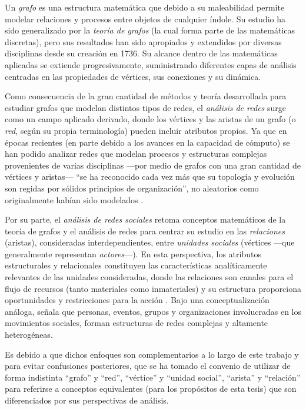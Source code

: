 \documentclass[letterpaper, 11pt]{book}
\theoremstyle{definition}
\theoremstyle{remark}
\begin{document}
Un \emph{grafo} es una estructura matemática que debido a su maleabilidad permite modelar relaciones y procesos entre objetos de cualquier índole. Su estudio ha sido generalizado por la \emph{teoría de grafos} (la cual forma parte de las matemáticas discretas), pero sus resultados han sido apropiados y extendidos por diversas disciplinas desde su creación en 1736. Su alcance dentro de las matemáticas aplicadas se extiende progresivamente, suministrando diferentes capas de análisis centradas en las propiedades de vértices, sus conexiones y su dinámica.


Como consecuencia de la gran cantidad de métodos y teoría desarrollada para estudiar grafos que modelan distintos tipos de redes, el \emph{análisis de redes} surge como un campo aplicado derivado, donde los vértices y las aristas de un grafo (o \emph{red}, según su propia terminología) pueden incluir atributos propios. 
Ya que en épocas recientes (en parte debido a los avances en la capacidad de cómputo) se han podido analizar redes que modelan procesos y estructuras complejas provenientes de varias disciplinas ---por medio de grafos con una gran cantidad de vértices y aristas--- ``se ha reconocido cada vez más que su topología y evolución son regidas por sólidos principios de organización'', no aleatorios como originalmente habían sido modelados \citep[47]{2002_Barabasi_MechanicsOfComplexNetworks}.

Por su parte, el \emph{análisis de redes sociales} retoma conceptos matemáticos de la teoría de grafos y el análisis de redes para centrar su estudio en las \emph{relaciones} (aristas), consideradas interdependientes, entre \emph{unidades sociales} (vértices ---que generalmente representan \emph{actores}---). 
En esta perspectiva, los atributos estructurales y relacionales constituyen las características analíticamente relevantes de las unidades consideradas, donde las relaciones son canales para el flujo de recursos (tanto materiales como inmateriales) y su estructura proporciona oportunidades y restricciones para la acción \citep[368]{2014_Caiani_SNA}. 
Bajo una conceptualización análoga, \citet{2003_Diani_SocialNetworks} señala que personas, eventos, grupos y organizaciones involucradas en los movimientos sociales, forman estructuras de redes complejas y altamente heterogéneas. 


Es debido a que dichos enfoques son complementarios a lo largo de este trabajo y para evitar confusiones posteriores, que se ha tomado el convenio de utilizar de forma indistinta ``grafo'' y ``red'', ``vértice'' y ``unidad social'', ``arista'' y ``relación'' para referirse a conceptos equivalentes (para los propósitos de esta tesis) que son diferenciados por sus perspectivas de análisis.
\end{document}
